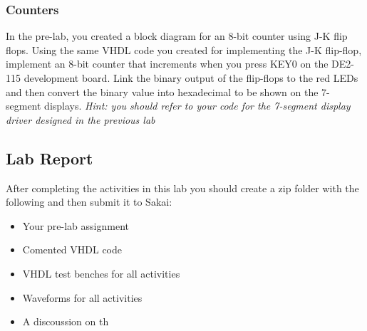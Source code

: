 \subsubsection{Counters}
In the pre-lab, you created a block diagram for an 8-bit counter using J-K flip flops. Using the same VHDL code you created for implementing the J-K flip-flop, implement an 8-bit counter that increments when you press KEY0 on the DE2-115 development board. Link the binary output of the flip-flops to the red LEDs and then convert the binary value into hexadecimal to be shown on the 7-segment displays. \emph{Hint: you should refer to your code for the 7-segment display driver designed in the previous lab}

\subsection{Lab Report}
After completing the activities in this lab you should create a zip folder with the following and then submit it to Sakai:

\begin{itemize}
	\item Your pre-lab assignment
	\item Comented VHDL code
	\item VHDL test benches for all activities
	\item Waveforms for all activities
	\item A discoussion on th
\end{itemize}